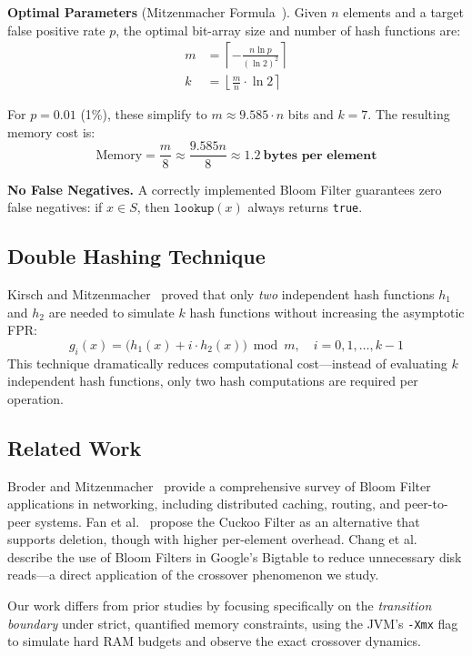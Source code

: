 \textbf{Optimal Parameters} (Mitzenmacher Formula~\citep{mitzenmacher2017}). Given $n$ elements and a target false positive rate $p$, the optimal bit-array size and number of hash functions are:
\begin{align}
    m &= \left\lceil -\frac{n \ln p}{(\ln 2)^2} \right\rceil \label{eq:optimal_m} \\
    k &= \left\lfloor \frac{m}{n} \cdot \ln 2 \right\rceil \label{eq:optimal_k}
\end{align}

For $p = 0.01$ (1\%), these simplify to $m \approx 9.585 \cdot n$ bits and $k = 7$. The resulting memory cost is:
\[
    \text{Memory} = \frac{m}{8} \approx \frac{9.585n}{8} \approx \mathbf{1.2}~\textbf{bytes per element}
\]

\textbf{No False Negatives.} A correctly implemented Bloom Filter guarantees zero false negatives: if $x \in S$, then $\texttt{lookup}(x)$ always returns \texttt{true}.

\subsection{Double Hashing Technique}
\label{subsec:doublehash}

Kirsch and Mitzenmacher~\citep{kirsch2006} proved that only \emph{two} independent hash functions $h_1$ and $h_2$ are needed to simulate $k$ hash functions without increasing the asymptotic FPR:
\begin{equation}
    g_i(x) = \bigl(h_1(x) + i \cdot h_2(x)\bigr) \bmod m, \quad i = 0, 1, \ldots, k{-}1
    \label{eq:doublehash}
\end{equation}
This technique dramatically reduces computational cost---instead of evaluating $k$ independent hash functions, only two hash computations are required per operation.

\subsection{Related Work}

Broder and Mitzenmacher~\citep{broder2004} provide a comprehensive survey of Bloom Filter applications in networking, including distributed caching, routing, and peer-to-peer systems. Fan et al.~\citep{fan2014} propose the Cuckoo Filter as an alternative that supports deletion, though with higher per-element overhead. Chang et al.~\citep{chang2008} describe the use of Bloom Filters in Google's Bigtable to reduce unnecessary disk reads---a direct application of the crossover phenomenon we study.

Our work differs from prior studies by focusing specifically on the \emph{transition boundary} under strict, quantified memory constraints, using the JVM's \texttt{-Xmx} flag to simulate hard RAM budgets and observe the exact crossover dynamics.
